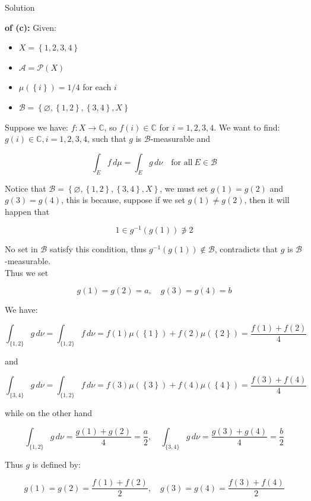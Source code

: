 \documentclass{qlnotes-export}
\begin{document}
\begin{qlsolution}{Solution}

\textbf{of (c):} Given:

\begin{itemize}
\item
  \(X = \left\{ {1,2,3,4} \right\}\)
\item
  \(\mathcal{A} = \mathcal{P}(X)\)
\item
  \(\mu(\left\{ i \right\}) = 1/4\) for each \(i\)
\item
  \(\mathcal{B} = \left\{ {\varnothing,\left\{ {1,2} \right\},\left\{ {3,4} \right\},X} \right\}\)
\end{itemize}

Suppose we have: \(f:X\rightarrow{\mathbb{C}}\), so \(f(i) \in {\mathbb{C}}\) for \(i = 1,2,3,4\). We want to find: \(g(i) \in {\mathbb{C}},i = 1,2,3,4\), such that \(g\) is \(\mathcal{B}\)-measurable and

\[\int_{E}f\, d\mu = \int_{E}g\, d\nu\quad\text{for all}\ E \in \mathcal{B}\]

Notice that \(\mathcal{B} = \left\{ {\varnothing,\left\{ {1,2} \right\},\left\{ {3,4} \right\},X} \right\}\), we must set \(g(1) = g(2)\) and \(g(3) = g(4)\), this is because, suppose if we set \(g(1) \neq g(2)\), then it will happen that

\[1 \in g^{- 1}(g(1)) \not\ni 2\]

No set in \(\mathcal{B}\) satisfy this condition, thus \(g^{- 1}(g(1)) \notin \mathcal{B}\), contradicts that \(g\) is \(\mathcal{B}\)-measurable.\\
Thus we set

\[g(1) = g(2) = a,\quad g(3) = g(4) = b\]

We have:

\[\int_{\{{1,2}\}}g\, d\nu = \int_{\{{1,2}\}}f\, d\nu = f(1)\mu(\left\{ 1 \right\}) + f(2)\mu(\left\{ 2 \right\}) = \frac{f(1) + f(2)}{4}\]

and

\[\int_{\{{3,4}\}}g\, d\nu = \int_{\{{1,2}\}}f\, d\nu = f(3)\mu(\left\{ 3 \right\}) + f(4)\mu(\left\{ 4 \right\}) = \frac{f(3) + f(4)}{4}\]

while on the other hand

\[\int_{\{{1,2}\}}g\, d\nu = \frac{g(1) + g(2)}{4} = \frac{a}{2},\quad\int_{\{{3,4}\}}g\, d\nu = \frac{g(3) + g(4)}{4} = \frac{b}{2}\]

Thus \(g\) is defined by:

\[g(1) = g(2) = \frac{f(1) + f(2)}{2},\quad g(3) = g(4) = \frac{f(3) + f(4)}{2}\]


\end{qlsolution}
\end{document}
